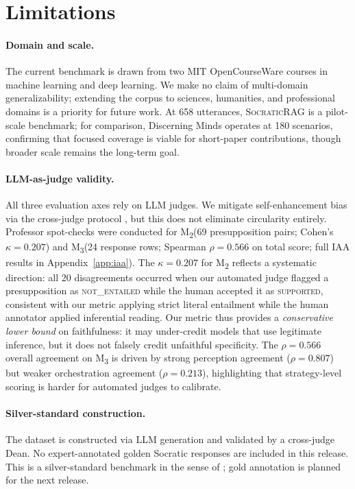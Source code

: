 \documentclass[11pt]{article}
\newcommand{\ours}{\textsc{SocraticRAG}\xspace}
\newcommand{\mtwo}{M\textsubscript{2}\xspace}
\newcommand{\mthree}{M\textsubscript{3}\xspace}
\begin{document}
\section*{Limitations}
\label{sec:limitations}

\paragraph{Domain and scale.}
The current benchmark is drawn from two MIT OpenCourseWare courses in machine
learning and deep learning.
We make no claim of multi-domain generalizability; extending the corpus to
sciences, humanities, and professional domains is a priority for future
work.
At 658 utterances, \ours is a pilot-scale benchmark; for comparison,
Discerning Minds \citep{liuy2025discerning} operates at 180 scenarios,
confirming that focused coverage is viable for short-paper contributions,
though broader scale remains the long-term goal.

\paragraph{LLM-as-judge validity.}
All three evaluation axes rely on LLM judges.
We mitigate self-enhancement bias via the cross-judge protocol
\citep{zheng2024judging,du2024improving,chan2024chateval}, but this does
not eliminate circularity entirely.
Professor spot-checks were conducted for \mtwo (69 presupposition pairs;
Cohen's $\kappa = 0.207$) and \mthree (24 response rows; Spearman
$\rho = 0.566$ on total score; full IAA results in
Appendix~\ref{app:iaa}).
The $\kappa = 0.207$ for \mtwo reflects a systematic direction: all 20
disagreements occurred when our automated judge flagged a presupposition
as \textsc{not\_entailed} while the human accepted it as \textsc{supported},
consistent with our metric applying strict literal entailment while the
human annotator applied inferential reading.
Our metric thus provides a \emph{conservative lower bound} on faithfulness:
it may under-credit models that use legitimate inference, but it does not
falsely credit unfaithful specificity.
The $\rho = 0.566$ overall agreement on \mthree is driven by strong
perception agreement ($\rho = 0.807$) but weaker orchestration agreement
($\rho = 0.213$), highlighting that strategy-level scoring is harder for
automated judges to calibrate.

\paragraph{Silver-standard construction.}
The dataset is constructed via LLM generation and validated by a cross-judge
Dean.
No expert-annotated golden Socratic responses are included in this release.
This is a silver-standard benchmark in the sense of
\citet{macina2025mathtutorbench}; gold annotation is planned for the next
release.
\end{document}
